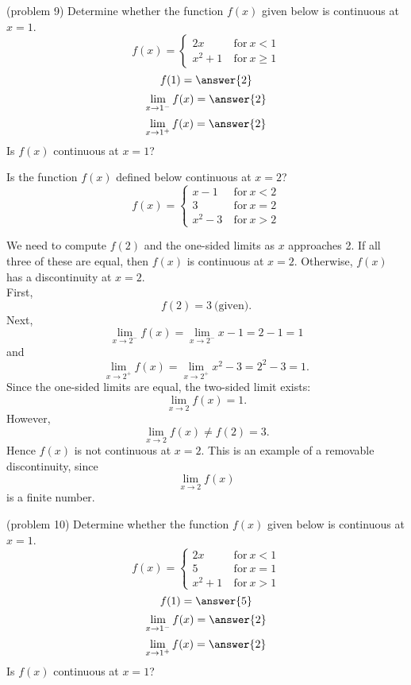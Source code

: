 \documentclass[handout]{ximera}
\begin{document}
\begin{problem}(problem 9)
Determine whether the function $f(x)$ given below is continuous at $x = 1$.
\[
f(x) = \left\{
     \begin{array}{lr}
       2x & \ \text{for} \  x < 1 \\
       x^2 + 1 & \ \text{for} \ x \geq 1
     \end{array}
   \right.
\]
\[
f(1) = \answer{2}
\]
\[
\lim_{x \to 1^-} f(x) = \answer{2}
\]
\[
\lim_{x \to 1^+} f(x) = \answer{2}
\]
Is $f(x)$ continuous at $x = 1$?
\begin{multipleChoice}
\end{multipleChoice}
\end{problem}




\begin{example}[example 10]
Is the function $f(x)$ defined below continuous at $x = 2$?
\[
f(x) = \left\{
     \begin{array}{lr}
       x-1 & \ \text{for} \  x < 2 \\
			 3 & \ \text{for} \  x = 2 \\
       x^2 - 3 & \ \text{for} \ x > 2
     \end{array}
   \right.
\]


We need to  compute $f(2)$ and the one-sided limits as $x$ approaches 2.
If all three of these are equal, then $f(x)$ is continuous at $x=2$.
Otherwise, $f(x)$ has a discontinuity at $x=2$.\\
First, 
\[
f(2) = 3 \ \text{(given)}.
\]
Next, 
\[
\lim_{x \to 2^-} f(x) = \lim_{x \to 2^-} x-1 = 2-1 = 1
\]
and
\[
\lim_{x \to 2^+} f(x) = \lim_{x \to 2^+} x^2 - 3 = 2^2 - 3 = 1.
\]
Since the one-sided limits are equal, the two-sided limit exists:
\[
\lim_{x \to 2} f(x) = 1.
\]
However,
\[
\lim_{x \to 2} f(x) \neq f(2) = 3.
\]
Hence $f(x)$ is not continuous at $x = 2$.
This is an example of a removable discontinuity, since 
\[\lim_{x \to 2} f(x) \]
is a finite number.
\end{example}


\begin{problem}(problem 10)
Determine whether the function $f(x)$ given below is continuous at $x = 1$.
\[
f(x) = \left\{
     \begin{array}{lr}
       2x & \ \text{for} \  x < 1 \\
			 5 & \ \text{for} \  x = 1 \\
       x^2 + 1 & \ \text{for} \ x > 1
     \end{array}
   \right.
\]
\[
f(1) = \answer{5}
\]
\[
\lim_{x \to 1^-} f(x) = \answer{2}
\]
\[
\lim_{x \to 1^+} f(x) = \answer{2}
\]
Is $f(x)$ continuous at $x = 1$?
\begin{multipleChoice}
\end{multipleChoice}
\end{problem}
\end{document}
